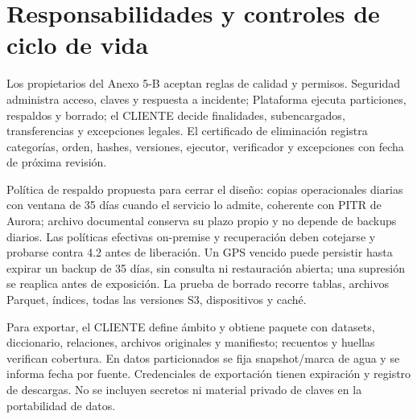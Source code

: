 \section*{Responsabilidades y controles de ciclo de vida}
Los propietarios del Anexo 5-B aceptan reglas de calidad y permisos. Seguridad administra acceso, claves y respuesta a incidente; Plataforma ejecuta particiones, respaldos y borrado; el CLIENTE decide finalidades, subencargados, transferencias y excepciones legales. El certificado de eliminación registra categorías, orden, hashes, versiones, ejecutor, verificador y excepciones con fecha de próxima revisión.

Política de respaldo propuesta para cerrar el diseño: copias operacionales diarias con ventana de 35 días cuando el servicio lo admite, coherente con PITR de Aurora; archivo documental conserva su plazo propio y no depende de backups diarios. Las políticas efectivas on-premise y recuperación deben cotejarse y probarse contra 4.2 antes de liberación. Un GPS vencido puede persistir hasta expirar un backup de 35 días, sin consulta ni restauración abierta; una supresión se reaplica antes de exposición. La prueba de borrado recorre tablas, archivos Parquet, índices, todas las versiones S3, dispositivos y caché.

Para exportar, el CLIENTE define ámbito y obtiene paquete con datasets, diccionario, relaciones, archivos originales y manifiesto; recuentos y huellas verifican cobertura. En datos particionados se fija snapshot/marca de agua y se informa fecha por fuente. Credenciales de exportación tienen expiración y registro de descargas. No se incluyen secretos ni material privado de claves en la portabilidad de datos.
